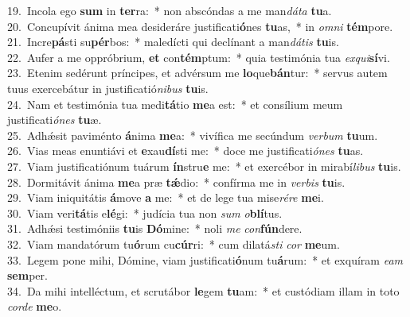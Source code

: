 {19.~}Incola ego \textbf{sum} in \textbf{ter}ra:~* non abscóndas a me man\textit{dá}\textit{ta} \textbf{tu}a.\\
{20.~}Concupívit ánima mea desideráre justificati\textbf{ó}nes \textbf{tu}as,~* in \textit{om}\textit{ni} \textbf{tém}pore.\\
{21.~}Incre\textbf{pá}sti su\textbf{pér}bos:~* maledícti qui declínant a man\textit{dá}\textit{tis} \textbf{tu}is.\\
{22.~}Aufer a me oppróbrium, \textbf{et} con\textbf{tém}ptum:~* quia testimónia tua \textit{ex}\textit{qui}\textbf{sí}vi.\\
{23.~}Etenim sedérunt príncipes, et advérsum me \textbf{lo}que\textbf{bán}tur:~* servus autem tuus exercebátur in justificatió\textit{ni}\textit{bus} \textbf{tu}is.\\
{24.~}Nam et testimónia tua medi\textbf{tá}tio \textbf{me}a est:~* et consílium meum justificati\textit{ó}\textit{nes} \textbf{tu}æ.\\
{25.~}Adhǽsit paviménto \textbf{á}nima \textbf{me}a:~* vivífica me secúndum \textit{ver}\textit{bum} \textbf{tu}um.\\
{26.~}Vias meas enuntiávi et \textbf{e}xau\textbf{dí}sti me:~* doce me justificati\textit{ó}\textit{nes} \textbf{tu}as.\\
{27.~}Viam justificatiónum tuárum \textbf{ín}stru\textbf{e} me:~* et exercébor in mirabí\textit{li}\textit{bus} \textbf{tu}is.\\
{28.~}Dormitávit ánima \textbf{me}a præ \textbf{tǽ}dio:~* confírma me in \textit{ver}\textit{bis} \textbf{tu}is.\\
{29.~}Viam iniquitátis \textbf{á}move \textbf{a} me:~* et de lege tua mise\textit{ré}\textit{re} \textbf{me}i.\\
{30.~}Viam veri\textbf{tá}tis e\textbf{lé}gi:~* judícia tua non \textit{sum} \textit{o}\textbf{blí}tus.\\
{31.~}Adhǽsi testimóniis \textbf{tu}is \textbf{Dó}mine:~* noli \textit{me} \textit{con}\textbf{fún}dere.\\
{32.~}Viam mandatórum tu\textbf{ó}rum cu\textbf{cúr}ri:~* cum dilatá\textit{sti} \textit{cor} \textbf{me}um.\\
{33.~}Legem pone mihi, Dómine, viam justificati\textbf{ó}num tu\textbf{á}rum:~* et exquíram \textit{e}\textit{am} \textbf{sem}per.\\
{34.~}Da mihi intelléctum, et scrutábor \textbf{le}gem \textbf{tu}am:~* et custódiam illam in toto \textit{cor}\textit{de} \textbf{me}o.\\
